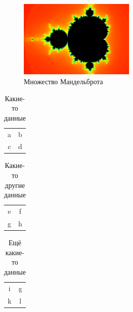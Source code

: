 \documentclass[a4paper, 12pt]{article}
\begin{document}
    \begin{figure}[h] %
        \includegraphics[width = 0.5\textwidth]{image.png}
        \caption{Множество Мандельброта} %
        \label{fig:figure2} %
    \end{figure}


    \begin{table}[p] %
        \begin{tabular}{|c|c|}
            a & b\\
            c & d
        \end{tabular}
        \caption{Какие-то данные} %
        \label{tab:table1} %
    \end{table}

    \begin{table}[p] %
        \begin{tabular}{|c|c|}
            e & f\\
            g & h
        \end{tabular}
        \caption{Какие-то другие данные} %
        \label{tab:table2} %
    \end{table}

    \setcounter{table}{7} %

    \begin{table}[p] %
        \begin{tabular}{|c|c|}
            i & g\\
            k & l
        \end{tabular}
        \caption{Ещё какие-то данные} %
        \label{tab:table8} %
    \end{table}
\end{document}
